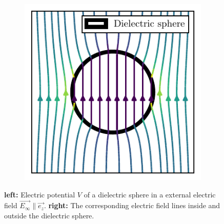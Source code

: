 \begin{figure}[!htbp]
\begin{subfigure}[b]{0.48\textwidth}
      \includegraphics[width=\textwidth]{./../figures/others/field-dielectric-sphere-small.pdf}
  \end{subfigure}
  \caption{\textbf{left:} Electric potential $V$ of a dielectric sphere in a external electric field $\vec{E_\infty} \parallel \vec{e_z}$. \textbf{right:} The corresponding electric field lines inside and outside the dielectric sphere.}
  \label{fig:apx:dielectric-sphere-field}
\end{figure}




